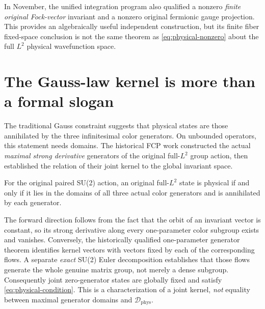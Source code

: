 In November, the unified integration program also qualified a nonzero
\emph{finite original Fock-vector} invariant and a nonzero original
fermionic gauge projection. This provides an algebraically useful
independent construction, but its finite fiber fixed-space conclusion
is not the same theorem as \eqref{eq:physical-nonzero} about the full
$L^2$ physical wavefunction space.

\section{The Gauss-law kernel is more than a formal slogan}
The traditional Gauss constraint suggests that physical states are those
annihilated by the three infinitesimal color generators. On unbounded
operators, this statement needs domains. The historical FCP work
constructed the actual \emph{maximal strong derivative} generators of
the original full-$L^2$ group action, then established the relation of
their joint kernel to the global invariant space.

\begin{sourceaccount}
For the original paired SU(2) action, an original full-$L^2$ state is
physical if and only if it lies in the domains of all three actual color
generators and is annihilated by each generator.
\end{sourceaccount}
\begin{sourceexplanation}
The forward direction follows from the fact that the orbit of an
invariant vector is constant, so its strong derivative along every
one-parameter color subgroup exists and vanishes. Conversely, the
historically qualified one-parameter generator theorem identifies
kernel vectors with vectors fixed by each of the corresponding flows.
A separate \emph{exact} SU(2) Euler decomposition establishes that those
flows generate the whole genuine matrix group, not merely a dense
subgroup. Consequently joint zero-generator states are globally fixed
and satisfy \eqref{eq:physical-condition}. This is a characterization
of a joint kernel, \emph{not} equality between maximal generator domains
and $\mathscr D_{\mathrm{phys}}$.
\end{sourceexplanation}

